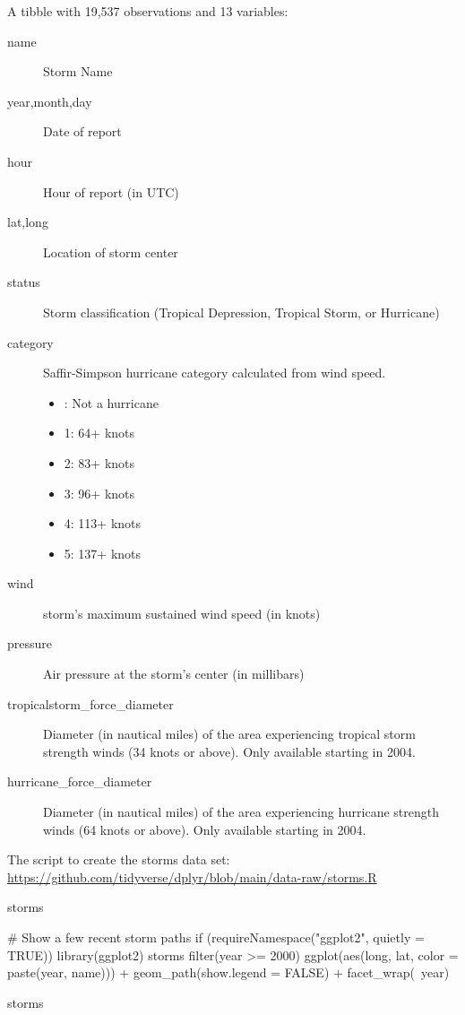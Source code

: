 \documentclass[a4paper]{book}
\begin{document}
%
\begin{Format}
A tibble with 19,537 observations
and 13 variables:
\begin{description}

\item[name] Storm Name
\item[year,month,day] Date of report
\item[hour] Hour of report (in UTC)
\item[lat,long] Location of storm center
\item[status] Storm classification (Tropical Depression, Tropical Storm,
or Hurricane)
\item[category] Saffir-Simpson hurricane category calculated from wind speed.
\begin{itemize}

\item{} : Not a hurricane
\item{} 1: 64+ knots
\item{} 2: 83+ knots
\item{} 3: 96+ knots
\item{} 4: 113+ knots
\item{} 5: 137+ knots

\end{itemize}


\item[wind] storm's maximum sustained wind speed (in knots)
\item[pressure] Air pressure at the storm's center (in millibars)
\item[tropicalstorm\_force\_diameter] Diameter (in nautical miles) of the
area experiencing tropical storm strength winds (34 knots or above).
Only available starting in 2004.
\item[hurricane\_force\_diameter] Diameter (in nautical miles) of the area
experiencing hurricane strength winds (64 knots or above). Only available
starting in 2004.

\end{description}

\end{Format}
%
\begin{SeeAlso}
The script to create the storms data set:
\url{https://github.com/tidyverse/dplyr/blob/main/data-raw/storms.R}
\end{SeeAlso}
%
\begin{Examples}
\begin{ExampleCode}
storms

# Show a few recent storm paths
if (requireNamespace("ggplot2", quietly = TRUE)) {
  library(ggplot2)
  storms %
    filter(year >= 2000) %
    ggplot(aes(long, lat, color = paste(year, name))) +
    geom_path(show.legend = FALSE) +
    facet_wrap(~year)
}

storms
\end{ExampleCode}
\end{Examples}
\end{document}
